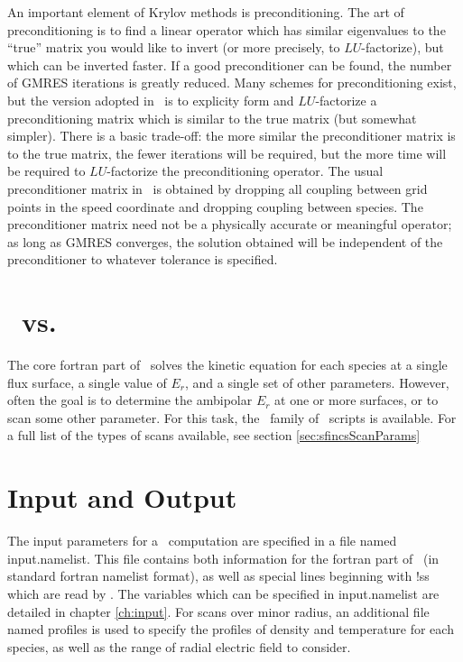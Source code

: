 An important element of Krylov methods is preconditioning.  The art of preconditioning is to find a linear operator which has similar eigenvalues
to the ``true'' matrix you would like to invert (or more precisely, to $LU$-factorize), but which can be inverted faster.
If a good preconditioner can be found, the number of GMRES iterations is greatly reduced.  Many schemes for preconditioning exist,
but the version adopted in \sfincs~is to explicity form and $LU$-factorize a preconditioning matrix which is similar
to the true matrix (but somewhat simpler).  There is a basic trade-off:
the more similar the preconditioner matrix is to the true matrix, the fewer iterations will be required, but the more time will
be required to $LU$-factorize the preconditioning operator.  The usual preconditioner matrix in \sfincs~is obtained by dropping all coupling
between grid points in the speed coordinate and dropping coupling between species.  The preconditioner matrix need not be a physically
accurate or meaningful operator; as long as GMRES converges, the solution obtained will be independent of the preconditioner to whatever tolerance is specified.

\section{\sfincs~vs. \sfincsScan}
The core fortran part of \sfincs~solves the kinetic equation for each species
at a single flux surface, a single value of $E_r$, and a single set of other parameters.
However, often the goal is to determine the ambipolar $E_r$ at one or more surfaces, or to scan some other parameter.
For this task, the \sfincsScan~family of \python~scripts is available.
For a full list of the types of scans available, see section \ref{sec:sfincsScanParams}

\section{Input and Output}

The input parameters for a \sfincs~computation are specified in a file named {\ttfamily input.namelist}.
This file contains both information for the fortran part of \sfincs~(in standard fortran namelist format),
as well as special lines beginning with {\ttfamily !ss} which are read by \sfincsScan.
The variables which can be specified in {\ttfamily input.namelist} are detailed in chapter \ref{ch:input}.
For scans over minor radius, an additional file named {\ttfamily profiles} is used to specify the profiles of density and temperature
for each species, as well as the range of radial electric field to consider.

